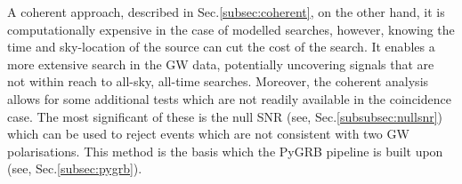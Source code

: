 \documentclass[binding=0.6cm, LaM]{sapthesis}
\begin{document}
        A coherent approach, described in Sec.\ref{subsec:coherent}, on the other hand,
        it is computationally expensive in the case of modelled searches,
        however, knowing the time and sky-location of the source can cut the cost of the search.
        It enables a more extensive search in the GW data, potentially uncovering signals
        that are not within reach to all-sky, all-time searches.
        Moreover, the coherent analysis allows for some additional tests
        which are not readily available in the coincidence case.
        The most significant of these is the null SNR (see, Sec.\ref{subsubsec:nullsnr}) which can be used to reject events which are
        not consistent with two GW polarisations.
        This method is the  basis which the  {\ttfamily PyGRB}  pipeline is built upon (see, Sec.\ref{subsec:pygrb}).
\end{document}
